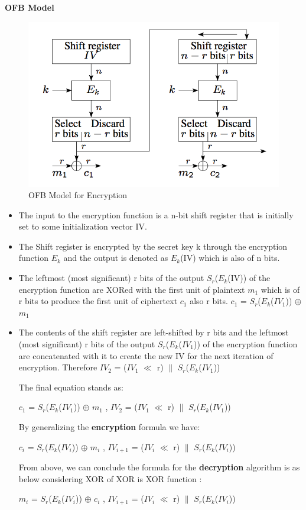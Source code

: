 \documentclass{article}
\begin{document}
\bigskip
\textbf{OFB Model}
\begin{figure}[h!]
\centering
\includegraphics[scale=0.5]{OFB_mode.png}
\caption{OFB Model for Encryption}
\label{fig:aesni_output_in_c}
\end{figure}
\begin{itemize}
\item The input to the encryption function is a n-bit shift register that is initially set to some initialization vector IV.

\item The Shift register is encrypted by the secret key k through the encryption function $E_k$ and the output is denoted as $E_k$(IV) which is also of n bits.

\item The leftmost (most significant) r bits of the output $S_r$($E_k$(IV)) of the encryption function are XORed with the first unit of plaintext $m_1$ which is of r bits to produce the first unit of ciphertext $c_1$ also r bits. 
$c_1$ = $S_r$($E_k$($IV_1$)) $\oplus$ $m_1$

\item The contents of the shift register are left-shifted by r bits and the leftmost (most significant) r bits of the output $S_r$($E_k$($IV_1$)) of the encryption function are concatenated with it to create the new IV for the next iteration of encryption. Therefore $IV_2$ = ($IV_1$ $\ll$ r) $\|$ $S_r$($E_k$($IV_1$))

The final equation stands as:

$c_1$ = $S_r$($E_k$($IV_1$)) $\oplus$ $m_1$ , $IV_2$ = ($IV_1$ $\ll$ r) $\|$ $S_r$($E_k$($IV_1$))

By generalizing the \textbf{encryption} formula we have:

$c_i$ = $S_r$($E_k$($IV_i$)) $\oplus$ $m_i$ , $IV_{i+1}$ = ($IV_i$ $\ll$ r) $\|$ $S_r$($E_k$($IV_i$))

From above, we can conclude the formula for the \textbf{decryption} algorithm is as below considering XOR of XOR is XOR function :

$m_i$ = $S_r$($E_k$($IV_i$)) $\oplus$ $c_i$ , $IV_{i+1}$ = ($IV_i$ $\ll$ r) $\|$ $S_r$($E_k$($IV_i$))

\end{itemize}
\end{document}
